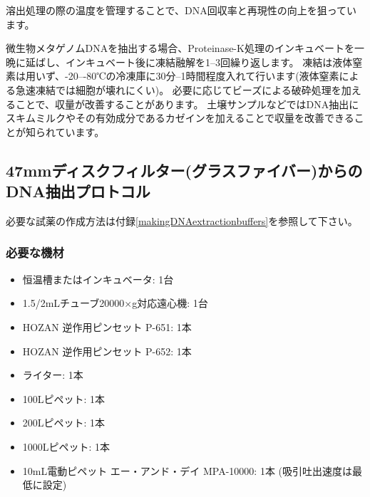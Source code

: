 \documentclass[titlepage,10pt,a4paper,uplatex]{jsbook}
\begin{document}
溶出処理の際の温度を管理することで、DNA回収率と再現性の向上を狙っています。

微生物メタゲノムDNAを抽出する場合、Proteinase-K処理のインキュベートを一晩に延ばし、インキュベート後に凍結融解を1--3回繰り返します。
凍結は液体窒素は用いず、{-20}--{-80}℃の冷凍庫に30分--1時間程度入れて行います(液体窒素による急速凍結では細胞が壊れにくい)。
必要に応じてビーズによる破砕処理を加えることで、収量が改善することがあります。
土壌サンプルなどではDNA抽出にスキムミルクやその有効成分であるカゼインを加えることで収量を改善できることが知られています\citep{Takada-Hoshino2004,Wang2012}。

\subsection{47mmディスクフィルター(グラスファイバー)からのDNA抽出プロトコル}

必要な試薬の作成方法は付録\ref{makingDNAextractionbuffers}を参照して下さい。

\subsubsection{必要な機材}
\begin{itemize}
\item 恒温槽またはインキュベータ: 1台
\item 1.5/2mLチューブ20000×g対応遠心機: 1台
\item HOZAN 逆作用ピンセット P-651: 1本
\item HOZAN 逆作用ピンセット P-652: 1本
\item ライター: 1本
\item 100{\textmu}Lピペット: 1本
\item 200{\textmu}Lピペット: 1本
\item 1000{\textmu}Lピペット: 1本
\item 10mL電動ピペット エー・アンド・デイ MPA-10000: 1本 (吸引吐出速度は最低に設定)
\end{itemize}
\end{document}
